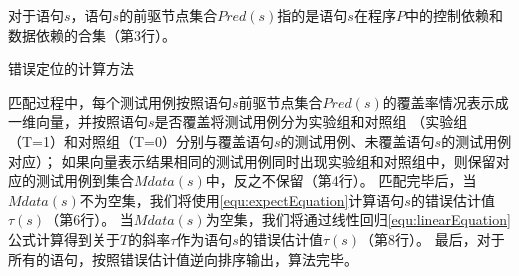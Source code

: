 对于语句$s$，语句$s$的前驱节点集合$Pred(s)$指的是语句$s$在程序$P$中的控制依赖和数据依赖的合集（第3行）。
\begin{algorithm}[hb]
	
	
	\caption{错误定位的计算方法} 
	
	
	\label{alg:fault-localization}
	
	
	
	
\end{algorithm}
匹配过程中，每个测试用例按照语句$s$前驱节点集合$Pred(s)$的覆盖率情况表示成一维向量，并按照语句$s$是否覆盖将测试用例分为实验组和对照组
（实验组（T=1）和对照组（T=0）分别与覆盖语句$s$的测试用例、未覆盖语句$s$的测试用例对应）；
如果向量表示结果相同的测试用例同时出现实验组和对照组中，则保留对应的测试用例到集合$Mdata(s)$中，反之不保留（第4行）。
匹配完毕后，当$Mdata(s)$不为空集，我们将使用\autoref{equ:expectEquation}计算语句$s$的错误估计值$\tau(s)$（第6行）。
当$Mdata(s)$为空集，我们将通过线性回归\autoref{equ:linearEquation}公式计算得到关于$T$的斜率$\tau$作为语句$s$的错误估计值$\tau(s)$（第8行）。
最后，对于所有的语句，按照错误估计值逆向排序输出，算法完毕。


